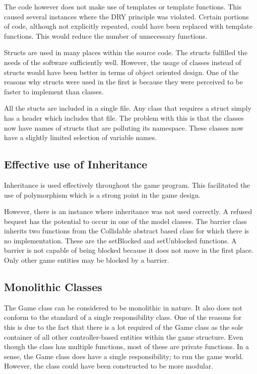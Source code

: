 \documentclass[10pt,twocolumn]{witseiepaper}
\begin{document}
The code however does not make use of templates or template functions. This caused several instances where the DRY principle was violated. Certain portions of code, although not explicitly repeated, could have been replaced with template functions. This would reduce the number of unnecessary functions.

Structs are used in many places within the source code. The structs fulfilled the needs of the software sufficiently well. However, the usage of classes instead of structs would have been better in terms of object oriented design. One of the reasons why structs were used in the first is because they were perceived to be faster to implement than classes.

All the stucts are included in a single file. Any class that requires a struct simply has a header which includes that file. The problem with this is that the classes now have names of structs that are polluting its namespace. These classes now have a slightly limited selection of variable names.

\subsection{Effective use of Inheritance}
Inheritance is used effectively throughout the game program. This facilitated the use of polymorphism which is a strong point in the game design.

However, there is an instance where inheritance was not used correctly. A refused bequest has the potential to occur in one of the model classes. The barrier class inherits two functions from the Collidable abstract based class for which there is no implementation. These are the setBlocked and setUnblocked functions. A barrier is not capable of being blocked because it does not move in the first place. Only other game entities may be blocked by a barrier.

\subsection{Monolithic Classes}
The Game class can be considered to be monolithic in nature. It also does not conform to the standard of a single responsibility class. One of the reasons for this is due to the fact that there is a lot required of the Game class as the sole container of all other controller-based entities within the game structure. Even though the class has multiple functions, most of these are private functions. In a sense, the Game class does have a single responsibility; to run the game world. However, the class could have been constructed to be more modular. 
\end{document}
